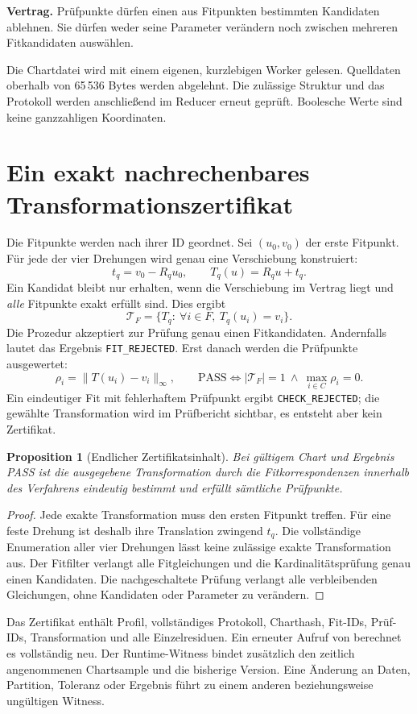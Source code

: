 \documentclass[11pt,a4paper]{article}
\newcommand{\contract}[1]{\vspace{3pt}\noindent\colorbox{pale}{\parbox{\dimexpr\linewidth-2\fboxsep}{\textbf{Vertrag.} #1}}\vspace{5pt}}
\newcommand{\nextsection}[2]{\clearpage{\color{accent}\small\textsf{#1}}\section{#2}}
\newtheorem{proposition}{Proposition}[section]
\begin{document}
\contract{Prüfpunkte dürfen einen aus Fitpunkten bestimmten Kandidaten
ablehnen. Sie dürfen weder seine Parameter verändern noch zwischen
mehreren Fitkandidaten auswählen.}

Die Chartdatei wird mit einem eigenen, kurzlebigen Worker gelesen.
Quelldaten oberhalb von 65\,536 Bytes werden abgelehnt. Die zulässige
Struktur und das Protokoll werden anschließend im Reducer erneut
geprüft. Boolesche Werte sind keine ganzzahligen Koordinaten.

\nextsection{56 / SCHÄTZUNG UND PRÜFUNG}{Ein exakt nachrechenbares Transformationszertifikat}
Die Fitpunkte werden nach ihrer ID geordnet. Sei $(u_0,v_0)$
der erste Fitpunkt. Für jede der vier Drehungen wird genau eine
Verschiebung konstruiert:
\[
 t_q=v_0-R_q u_0,\qquad T_q(u)=R_q u+t_q.
\]
Ein Kandidat bleibt nur erhalten, wenn die Verschiebung im Vertrag
liegt und \emph{alle} Fitpunkte exakt erfüllt sind. Dies ergibt
\[
 \mathcal T_F=\{T_q:\ \forall i\in F,\ T_q(u_i)=v_i\}.
\]
Die Prozedur akzeptiert zur Prüfung genau einen Fitkandidaten.
Andernfalls lautet das Ergebnis \texttt{FIT\_REJECTED}.
Erst danach werden die Prüfpunkte ausgewertet:
\[
 \rho_i=\lVert T(u_i)-v_i\rVert_\infty,\qquad
 \mathrm{PASS}\iff |\mathcal T_F|=1\ \land\ \max_{i\in C}\rho_i=0.
\]
Ein eindeutiger Fit mit fehlerhaftem Prüfpunkt ergibt
\texttt{CHECK\_REJECTED}; die gewählte Transformation wird im
Prüfbericht sichtbar, es entsteht aber kein Zertifikat.

\begin{proposition}[Endlicher Zertifikatsinhalt]
Bei gültigem Chart und Ergebnis PASS ist die ausgegebene
Transformation durch die Fitkorrespondenzen innerhalb des
Verfahrens eindeutig bestimmt und erfüllt sämtliche Prüfpunkte.
\end{proposition}
\begin{proof}
Jede exakte Transformation muss den ersten Fitpunkt treffen.
Für eine feste Drehung ist deshalb ihre Translation zwingend
$t_q$. Die vollständige Enumeration aller vier Drehungen lässt
keine zulässige exakte Transformation aus. Der Fitfilter verlangt
alle Fitgleichungen und die Kardinalitätsprüfung genau einen
Kandidaten. Die nachgeschaltete Prüfung verlangt alle verbleibenden
Gleichungen, ohne Kandidaten oder Parameter zu verändern.
\end{proof}

Das Zertifikat enthält Profil, vollständiges Protokoll, Charthash,
Fit-IDs, Prüf-IDs, Transformation und alle Einzelresiduen.
Ein erneuter Aufruf von  berechnet es
vollständig neu. Der Runtime-Witness bindet zusätzlich den
zeitlich angenommenen Chartsample und die bisherige Version.
Eine Änderung an Daten, Partition, Toleranz oder Ergebnis führt
zu einem anderen beziehungsweise ungültigen Witness.
\end{document}
